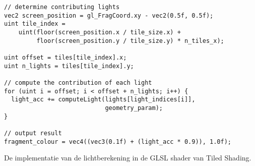 \begin{listing}[b]
 \begin{verbatim}
// determine contributing lights
vec2 screen_position = gl_FragCoord.xy - vec2(0.5f, 0.5f);
uint tile_index =
    uint(floor(screen_position.x / tile_size.x) +
         floor(screen_position.y / tile_size.y) * n_tiles_x);

uint offset = tiles[tile_index].x;
uint n_lights = tiles[tile_index].y;

// compute the contribution of each light
for (uint i = offset; i < offset + n_lights; i++) {
  light_acc += computeLight(lights[light_indices[i]],
                            geometry_param);
}

// output result
fragment_colour = vec4((vec3(0.1f) + (light_acc * 0.9)), 1.0f);
  \end{verbatim}
  \caption{De implementatie van de lichtberekening in de GLSL shader van Tiled Shading.}
  \label{lst:ts-lichttoekenning}
\end{listing}
